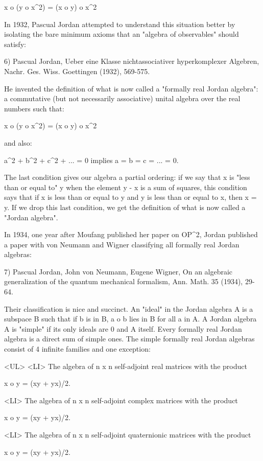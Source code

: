 x o (y o x^{2}) = (x o y) o x^{2}

In 1932, Pascual Jordan attempted to understand this situation better by
isolating the bare minimum axioms that an "algebra of observables"
should satisfy:

6) Pascual Jordan, Ueber eine Klasse nichtassociativer hyperkomplexer
Algebren, Nachr. Ges. Wiss. Goettingen (1932), 569-575.  

He invented the definition of what is now called a "formally real Jordan
algebra": a commutative (but not necessarily associative) unital algebra
over the real numbers such that:

x o (y o x^{2}) = (x o y) o x^{2}

and also:

a^{2} + b^{2} + c^{2} + ... = 0   implies   a = b = c = ... = 0.

The last condition gives our algebra a partial ordering: if we say that
x is "less than or equal to" y when the element y - x is a sum of
squares, this condition says that if x is less than or equal to y and 
y is less than or equal to x, then x = y.   If we drop this last
condition, we get the definition of what is now called a "Jordan
algebra".  

In 1934, one year after Moufang published her paper on OP^{2}, Jordan
published a paper with von Neumann and Wigner classifying all formally
real Jordan algebras:

7) Pascual Jordan, John von Neumann, Eugene Wigner, On an algebraic
generalization of the quantum mechanical formalism, Ann. Math. 35
(1934), 29-64.  

Their classification is nice and succinct.  An "ideal" in the
Jordan algebra A is a subspace B such that if b is in B, a o b lies in B
for all a in A.  A Jordan algebra A is "simple" if its only
ideals are {0} and A itself.  Every formally real Jordan algebra is a
direct sum of simple ones.  The simple formally real Jordan algebras
consist of 4 infinite families and one exception:

<UL>
<LI> The algebra of n x n self-adjoint real matrices with the product 

x o y = (xy + yx)/2.

<LI> The algebra of n x n self-adjoint complex matrices with the product 

x o y = (xy + yx)/2.

<LI> The algebra of n x n self-adjoint quaternionic matrices with the product 

x o y = (xy + yx)/2.

